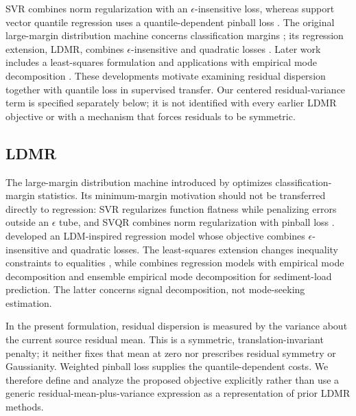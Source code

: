 
{\color{blue}SVR combines norm regularization with an $\epsilon$-insensitive loss, whereas support vector quantile regression uses a quantile-dependent pinball loss \citep{smola2004tutorial,takeuchi2006nonparametric}. The original large-margin distribution machine concerns classification margins \citep{zhang2014large}; its regression extension, LDMR, combines $\epsilon$-insensitive and quadratic losses \citep{rastogi2020ldmr}. Later work includes a least-squares formulation and applications with empirical mode decomposition \citep{gupta2021least,hazarika2023mode}. These developments motivate examining residual dispersion together with quantile loss in supervised transfer. Our centered residual-variance term is specified separately below; it is not identified with every earlier LDMR objective or with a mechanism that forces residuals to be symmetric.}

\subsection{LDMR}
{\color{blue}The large-margin distribution machine introduced by \citet{zhang2014large} optimizes classification-margin statistics. Its minimum-margin motivation should not be transferred directly to regression: SVR regularizes function flatness while penalizing errors outside an $\epsilon$ tube, and SVQR combines norm regularization with pinball loss \citep{smola2004tutorial,takeuchi2006nonparametric}. \citet{rastogi2020ldmr} developed an LDM-inspired regression model whose objective combines $\epsilon$-insensitive and quadratic losses. The least-squares extension changes inequality constraints to equalities \citep{gupta2021least}, while \citet{hazarika2023mode} combines regression models with empirical mode decomposition and ensemble empirical mode decomposition for sediment-load prediction. The latter concerns signal decomposition, not mode-seeking estimation.}

{\color{blue}In the present formulation, residual dispersion is measured by the variance about the current source residual mean. This is a symmetric, translation-invariant penalty; it neither fixes that mean at zero nor prescribes residual symmetry or Gaussianity. Weighted pinball loss supplies the quantile-dependent costs. We therefore define and analyze the proposed objective explicitly rather than use a generic residual-mean-plus-variance expression as a representation of prior LDMR methods.}

